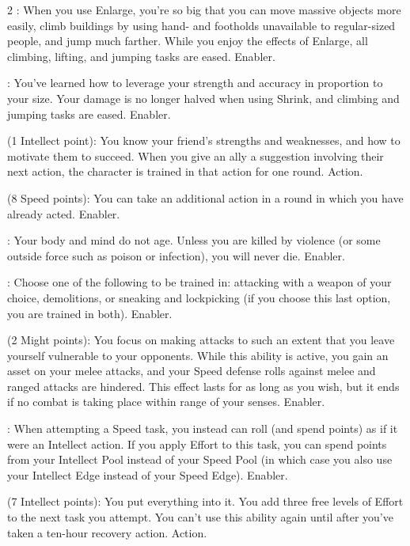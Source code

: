 \begin{multicols}{2}
: When you use Enlarge, you’re so big that you can move massive objects more easily, climb buildings by using hand- and footholds unavailable to regular-sized people, and jump much farther. While you enjoy the effects of Enlarge, all climbing, lifting, and jumping tasks are eased. Enabler. 

: You’ve learned how to leverage your strength and accuracy in proportion to your size. Your damage is no longer halved when using Shrink, and climbing and jumping tasks are eased. Enabler.

 (1 Intellect point): You know your friend’s strengths and weaknesses, and how to motivate them to succeed. When you give an ally a suggestion involving their next action, the character is trained in that action for one round. Action. 

 (8 Speed points): You can take an additional action in a round in which you have already acted. Enabler. 

: Your body and mind do not age. Unless you are killed by violence (or some outside force such as poison or infection), you will never die. Enabler.

: Choose one of the following to be trained in: attacking with a weapon of your choice, demolitions, or sneaking and lockpicking (if you choose this last option, you are trained in both). Enabler. 

 (2 Might points): You focus on making attacks to such an extent that you leave yourself vulnerable to your opponents. While this ability is active, you gain an asset on your melee attacks, and your Speed defense rolls against melee and ranged attacks are hindered. This effect lasts for as long as you wish, but it ends if no combat is taking place within range of your senses. Enabler.

: When attempting a Speed task, you instead can roll (and spend points) as if it were an Intellect action. If you apply Effort to this task, you can spend points from your Intellect Pool instead of your Speed Pool (in which case you also use your Intellect Edge instead of your Speed Edge). Enabler. 

 (7 Intellect points): You put everything into it. You add three free levels of Effort to the next task you attempt. You can’t use this ability again until after you’ve taken a ten-hour recovery action. Action. 


\end{multicols}
